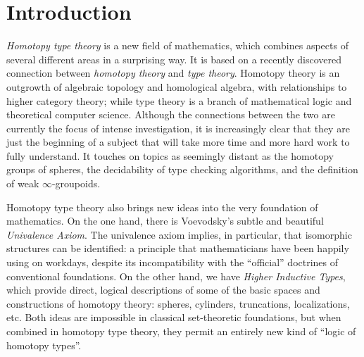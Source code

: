 \chapter*{Introduction} \label{cha:introduction}
\setcounter{page}{1}



%
%
%
%
%
%
%
%

\emph{Homotopy type theory} is a new field of mathematics, which combines aspects of several different areas in a surprising way.
It is based on a recently discovered connection between \emph{homotopy theory} and \emph{type theory}.
Homotopy theory is an outgrowth of algebraic topology and homological algebra, with relationships to higher category theory; while type theory is a branch of mathematical logic and theoretical computer science.
Although the connections between the two are currently the focus of intense investigation, it is increasingly clear that they are just the beginning of a subject that will take more time and more hard work to fully understand.
It touches on topics as seemingly distant as the homotopy groups of spheres, the decidability of type checking algorithms, and the definition of weak $\infty$-groupoids.

Homotopy type theory also brings new ideas into the very foundation of mathematics.
On the one hand, there is Voevodsky's subtle and beautiful \emph{Univalence Axiom}.
The univalence axiom implies, in particular, that isomorphic structures can be identified: a principle that mathematicians have been happily using on workdays, despite its incompatibility with the ``official'' doctrines of conventional foundations.
On the other hand, we have \emph{Higher Inductive Types}, which provide direct, logical descriptions of some of the basic spaces and constructions of homotopy theory: spheres, cylinders, truncations, localizations, etc.
Both ideas are impossible in classical set-theoretic foundations, but when combined in homotopy type theory, they permit an entirely new kind of ``logic of homotopy types''.

